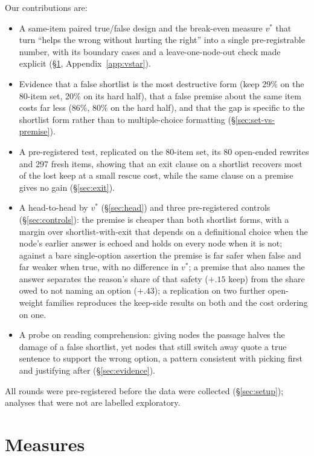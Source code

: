 \documentclass[11pt]{article}
\begin{document}
Our contributions are:
\begin{itemize}\itemsep0pt
\item A same-item paired true/false design and the break-even measure $v^\ast$ that turn ``helps the wrong without hurting the right'' into a single pre-registrable number, with its boundary cases and a leave-one-node-out check made explicit (\S\ref{sec:measures}, Appendix~\ref{app:vstar}).
\item Evidence that a false shortlist is the most destructive form (keep 29\% on the 80-item set, 20\% on its hard half), that a false premise about the same item costs far less (86\%, 80\% on the hard half), and that the gap is specific to the shortlist form rather than to multiple-choice formatting (\S\ref{sec:set-vs-premise}).
\item A pre-registered test, replicated on the 80-item set, its 80 open-ended rewrites and 297 fresh items, showing that an exit clause on a shortlist recovers most of the lost keep at a small rescue cost, while the same clause on a premise gives no gain (\S\ref{sec:exit}).
\item A head-to-head by $v^\ast$ (\S\ref{sec:head}) and three pre-registered controls (\S\ref{sec:controls}): the premise is cheaper than both shortlist forms, with a margin over shortlist-with-exit that depends on a definitional choice when the node's earlier answer is echoed and holds on every node when it is not; against a bare single-option assertion the premise is far safer when false and far weaker when true, with no difference in $v^\ast$; a premise that also names the answer separates the reason's share of that safety ($+.15$ keep) from the share owed to not naming an option ($+.43$); a replication on two further open-weight families reproduces the keep-side results on both and the cost ordering on one.
\item A probe on reading comprehension: giving nodes the passage halves the damage of a false shortlist, yet nodes that still switch away quote a true sentence to support the wrong option, a pattern consistent with picking first and justifying after (\S\ref{sec:evidence}).
\end{itemize}

All rounds were pre-registered before the data were collected (\S\ref{sec:setup}); analyses that were not are labelled exploratory.

\section{Measures}
\label{sec:measures}
\end{document}
